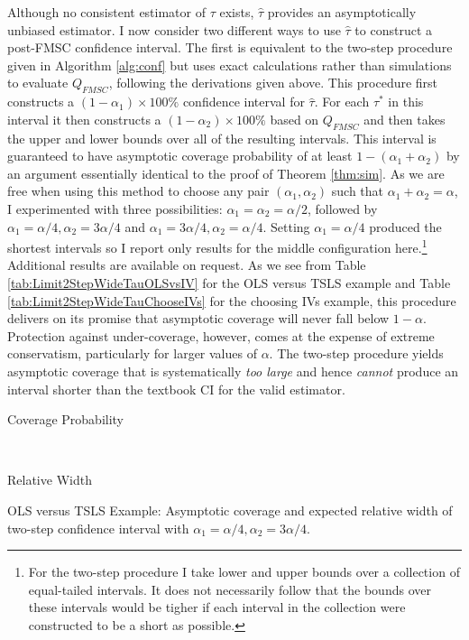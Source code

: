 Although no consistent estimator of $\tau$ exists, $\widehat{\tau}$ provides an asymptotically unbiased estimator.
I now consider two different ways to use $\widehat{\tau}$ to construct a post-FMSC confidence interval.
The first is equivalent to the two-step procedure given in Algorithm \ref{alg:conf} but uses exact calculations rather than simulations to evaluate $Q_{FMSC}$, following the derivations given above.
This procedure first constructs a $(1-\alpha_1)\times 100\%$ confidence interval for $\widehat{\tau}$.
For each $\tau^*$ in this interval it then constructs a $(1-\alpha_2)\times 100\%$ based on $Q_{FMSC}$ and then takes the upper and lower bounds over all of the resulting intervals.
This interval is guaranteed to have asymptotic coverage probability of at least $1 - (\alpha_1 + \alpha_2)$ by an argument essentially identical to the proof of Theorem \ref{thm:sim}.
As we are free when using this method to choose any pair $(\alpha_1, \alpha_2)$ such that $\alpha_1 + \alpha_2 = \alpha$, I experimented with three possibilities: $\alpha_1 = \alpha_2 = \alpha/2$, followed by $\alpha_1 = \alpha/4, \alpha_2 = 3\alpha/4$ and $\alpha_1 = 3\alpha/4, \alpha_2 = \alpha/4$.
Setting $\alpha_1 = \alpha/4$ produced the shortest intervals so I report only results for the middle configuration here.\footnote{For the two-step procedure I take lower and upper bounds over a collection of equal-tailed intervals. It does not necessarily follow that the bounds over these intervals would be tigher if each interval in the collection were constructed to be a short as possible.}
Additional results are available on request.
As we see from Table \ref{tab:Limit2StepWideTauOLSvsIV} for the OLS versus TSLS example and Table \ref{tab:Limit2StepWideTauChooseIVs} for the choosing IVs example, this procedure delivers on its promise that asymptotic coverage will never fall below $1-\alpha$.
Protection against under-coverage, however, comes at the expense of extreme conservatism, particularly for larger values of $\alpha$.
The two-step procedure yields asymptotic coverage that is systematically \emph{too large} and hence \emph{cannot} produce an interval shorter than the textbook CI for the valid estimator.


\begin{table}[h]
  \centering
  \begin{subtable}{0.48\textwidth}
    \caption{Coverage Probability}
    
  \end{subtable}
  ~
  \begin{subtable}{0.48\textwidth}
    \caption{Relative Width}
    
  \end{subtable}
  \caption{OLS versus TSLS Example: Asymptotic coverage and expected relative width of two-step confidence interval with $\alpha_1 = \alpha/4,  \alpha_2 = 3\alpha/4$.}
  \label{tab:Limit2StepWideTauOLSvsIV}
\end{table}

